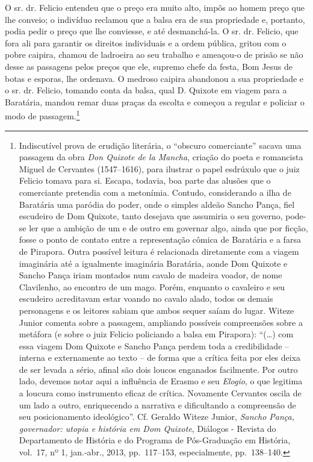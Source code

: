 O sr. dr. Felicio entendeu que o preço era muito alto, impôs ao homem
preço que lhe conveio; o indivíduo reclamou que a balsa era de sua
propriedade e, portanto, podia pedir o preço que lhe conviesse, e até
desmanchá-la. O sr. dr. Felicio, que fora ali para garantir os direitos
individuais e a ordem pública, gritou com o pobre caipira, chamou de
ladroeira ao seu trabalho e ameaçou-o de prisão se não desse as
passagens pelos preços que ele, supremo chefe da festa, Bom Jesus de
botas e esporas, lhe ordenava. O medroso caipira abandonou a sua
propriedade e o sr. dr. Felicio, tomando conta da balsa, qual D. Quixote
em viagem para a Baratária, mandou remar duas praças da escolta e
começou a regular e policiar o modo de passagem.\footnote{ Indiscutível
  prova de erudição literária, o ``obscuro comerciante'' sacava uma
  passagem da obra \emph{Don Quixote de la Mancha}, criação do poeta e
  romancista Miguel de Cervantes (1547--1616), para ilustrar o papel
  esdrúxulo que o juiz Felicio tomava para si. Escapa, todavia, boa
  parte das alusões que o comerciante pretendia com a metonímia.
  Contudo, considerando a ilha de Baratária uma paródia do poder, onde o
  simples aldeão Sancho Pança, fiel escudeiro de Dom Quixote, tanto
  desejava que assumiria o seu governo, pode-se ler que a ambição de um
  e de outro em governar algo, ainda que por ficção, fosse o ponto de
  contato entre a representação cômica de Baratária e a farsa de
  Pirapora. Outra possível leitura é relacionada diretamente com a
  viagem imaginária até a igualmente imaginária Baratária, aonde Dom
  Quixote e Sancho Pança iriam montados num cavalo de madeira voador, de
  nome Clavilenho, ao encontro de um mago. Porém, enquanto o cavaleiro e
  seu escudeiro acreditavam estar voando no cavalo alado, todos os
  demais personagens e os leitores sabiam que ambos sequer saíam do
  lugar. Witeze Junior comenta sobre a passagem, ampliando possíveis
  compreensões sobre a metáfora (e sobre o juiz Felicio policiando a
  balsa em Pirapora): ``(\ldots{}) com essa viagem Dom Quixote e Sancho Pança
  perdem toda a credibilidade -- interna e externamente ao texto -- de
  forma que a crítica feita por eles deixa de ser levada a sério, afinal
  são dois loucos enganados facilmente. Por outro lado, devemos notar
  aqui a influência de Erasmo e seu \emph{Elogio}, o que legitima a
  loucura como instrumento eficaz de crítica. Novamente Cervantes oscila
  de um lado a outro, enriquecendo a narrativa e dificultando a
  compreensão de seu posicionamento ideológico''. Cf. Geraldo Witeze
  Junior, \emph{Sancho Pança, governador: utopia e história em Dom
  Quixote}, Diálogos - Revista do Departamento de História e do Programa
  de Pós-Graduação em História, vol.~17, nº 1, jan.-abr., 2013,
  pp.~117--153, especialmente, pp.~138--140.}

